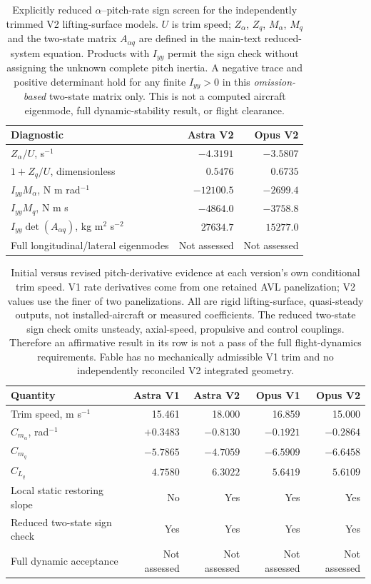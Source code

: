 \documentclass[11pt,a4paper]{article}
\begin{document}
\begin{table}[H]\centering\footnotesize
\caption{Explicitly reduced $\alpha$--pitch-rate sign screen for the independently trimmed V2 lifting-surface models. $U$ is trim speed; $Z_\alpha$, $Z_q$, $M_\alpha$, $M_q$ and the two-state matrix $A_{\alpha q}$ are defined in the main-text reduced-system equation. Products with $I_{yy}$ permit the sign check without assigning the unknown complete pitch inertia. A negative trace and positive determinant hold for any finite $I_{yy}>0$ in this \emph{omission-based} two-state matrix only. This is not a computed aircraft eigenmode, full dynamic-stability result, or flight clearance.}\label{tab:reduceddynamic}
\begin{tabular}{lrr}\toprule
Diagnostic & Astra V2 & Opus V2\\\midrule
$Z_\alpha/U$, s$^{-1}$ & $-4.3191$ & $-3.5807$\\
$1+Z_q/U$, dimensionless & $0.5476$ & $0.6735$\\
$I_{yy}M_\alpha$, N m rad$^{-1}$ & $-12100.5$ & $-2699.4$\\
$I_{yy}M_q$, N m s & $-4864.0$ & $-3758.8$\\
$I_{yy}\det(A_{\alpha q})$, kg m$^2$ s$^{-2}$ & $27634.7$ & $15277.0$\\
Full longitudinal/lateral eigenmodes & Not assessed & Not assessed\\\bottomrule
\end{tabular}
\end{table}
\begin{table}[H]\centering\footnotesize
\caption{Initial versus revised pitch-derivative evidence at each version's own conditional trim speed. V1 rate derivatives come from one retained AVL panelization; V2 values use the finer of two panelizations. All are rigid lifting-surface, quasi-steady outputs, not installed-aircraft or measured coefficients. The reduced two-state sign check omits unsteady, axial-speed, propulsive and control couplings. Therefore an affirmative result in its row is not a pass of the full flight-dynamics requirements. Fable has no mechanically admissible V1 trim and no independently reconciled V2 integrated geometry.}\label{tab:v1v2dynamic}
\begin{tabular}{lrrrr}\toprule
Quantity & Astra V1 & Astra V2 & Opus V1 & Opus V2\\\midrule
Trim speed, m s$^{-1}$ & 15.461 & 18.000 & 16.859 & 15.000\\
$C_{m_\alpha}$, rad$^{-1}$ & $+0.3483$ & $-0.8130$ & $-0.1921$ & $-0.2864$\\
$C_{m_q}$ & $-5.7865$ & $-4.7059$ & $-6.5909$ & $-6.6458$\\
$C_{L_q}$ & $4.7580$ & $6.3022$ & $5.6419$ & $5.6109$\\
Local static restoring slope & No & Yes & Yes & Yes\\
Reduced two-state sign check & Yes & Yes & Yes & Yes\\
Full dynamic acceptance & Not assessed & Not assessed & Not assessed & Not assessed\\\bottomrule
\end{tabular}
\end{table}
\end{document}
